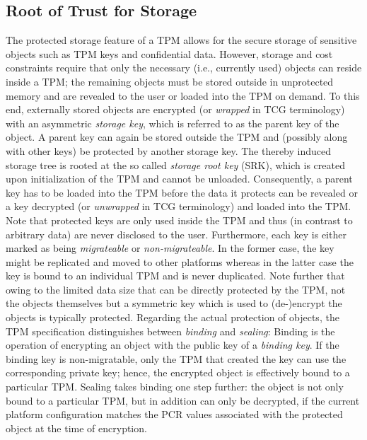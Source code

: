 \documentclass[runningheads]{llncs}
\begin{document}
\subsection{Root of Trust for Storage}
The protected storage feature of a TPM allows for the secure storage of
sensitive objects such as TPM keys and confidential data. However, storage
and cost constraints require that only the necessary (i.e., currently used)
objects can reside inside a TPM; the remaining objects must be stored outside
in unprotected memory and are revealed to the user or loaded into the TPM on
demand. To this end, externally stored objects are encrypted (or \emph{wrapped}
in TCG terminology) with an asymmetric \emph{storage key}, which is referred
to as the parent key of the object. A parent key can again be stored outside
the TPM and (possibly along with other keys) be protected by another storage
key. The thereby induced storage tree is rooted at the so called \emph{storage
root key} (SRK), which is created upon initialization of the TPM and cannot
be unloaded. Consequently, a parent key has to be loaded into the TPM before
the data it protects can be revealed or a key decrypted (or \emph{unwrapped}
in TCG terminology) and loaded into the TPM. Note that protected keys are
only used inside the TPM and thus (in contrast to arbitrary data) are never
disclosed to the user. Furthermore, each key is either marked as being
\emph{migrateable} or \emph{non-migrateable}.
In the former case, the key might be replicated and moved to other platforms
whereas in the latter case the key is bound to an individual TPM and is never
duplicated. Note further that owing to the limited data size that can be
directly protected by the TPM, not the objects themselves but a symmetric key
which is used to (de-)encrypt the objects is typically protected. Regarding
the actual protection of objects, the TPM specification distinguishes between
\emph{binding} and \emph{sealing}: Binding is the operation of encrypting an
object with the public key of a \emph{binding key}. If the binding key is
non-migratable, only the TPM that created the key can use the corresponding
private key; hence, the encrypted object is effectively bound to a particular
TPM. Sealing takes binding one step further: the object is not only bound to
a particular TPM, but in addition can only be decrypted, if the current
platform configuration matches the PCR values associated with the protected
object at the time of encryption.
\end{document}
